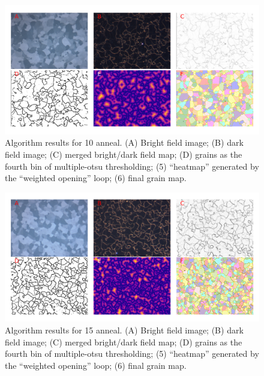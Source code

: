 \documentclass[12pt, titlepage]{article}
\begin{document}
	\begin{figure}[h]
		\centering
		\includegraphics[width=1.0\linewidth]{microstructure_10C.png}
		\caption{Algorithm results for 10  anneal. (A) Bright field image; (B) dark field image; (C) merged bright/dark field map; (D) grains as the fourth bin of multiple-otsu thresholding; (5) ``heatmap'' generated by the ``weighted opening'' loop; (6) final grain map.}
		\label{fig:micro_10C}
	\end{figure}

	\begin{figure}[h]
		\centering
		\includegraphics[width=1.0\linewidth]{microstructure_15C.png}
		\caption{Algorithm results for 15  anneal. (A) Bright field image; (B) dark field image; (C) merged bright/dark field map; (D) grains as the fourth bin of multiple-otsu thresholding; (5) ``heatmap'' generated by the ``weighted opening'' loop; (6) final grain map.}
		\label{fig:micro_15C}
	\end{figure}
\end{document}
